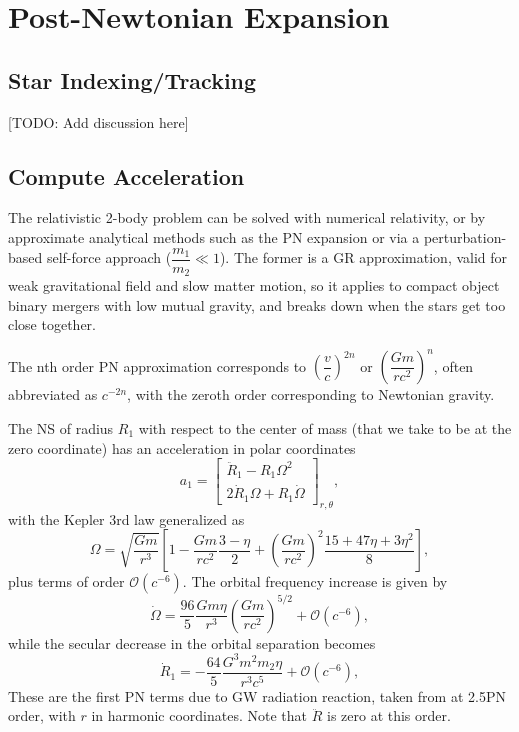 \documentclass{article}
\newcommand{\TODO}[1]{{\color{red}[}{\color{red}TODO:} {\color{blue}#1}{\color{red}]}}
\newcommand{\paren}[1]{\left(#1\right)}
\newcommand{\Ord}[1]{\mathcal{O}\paren{#1}}
\begin{document}
\section{Post-Newtonian Expansion}

\subsection{Star Indexing/Tracking}
\TODO{Add discussion here}

\subsection{Compute Acceleration}

The relativistic 2-body problem can be solved with numerical relativity, or by approximate analytical methods such as the PN expansion or via a perturbation-based self-force approach ($\dfrac{m_1}{m_2}\ll1$).
The former is a GR approximation, valid for weak gravitational field and slow matter motion, so it applies to compact object binary mergers with low mutual gravity, and breaks down when the stars get too close together.

The nth order PN approximation corresponds to $\left(\dfrac{v}{c}\right)^{2n}$ or $\left(\dfrac{G m}{r c^2}\right)^n$, often abbreviated as $c^{-2n}$, with the zeroth order corresponding to Newtonian gravity.

The NS of radius $R_1$ with respect to the center of mass (that we take to be at the zero coordinate) has an acceleration in polar coordinates
$$a_1=\begin{bmatrix}\ddot R_1-R_1\Omega^2\\2\dot R_1\Omega+R_1\dot\Omega\end{bmatrix}_{r,\theta} , $$ 
with the Kepler 3rd law generalized as
$$\Omega=\sqrt{\dfrac{Gm}{r^3}}\left[1-\dfrac{Gm}{rc^2}\dfrac{3-\eta}{2}+\left(\dfrac{Gm}{rc^2}\right)^2\dfrac{15+47\eta+3\eta^2}{8}\right],$$
plus terms of order $\Ord{c^{-6}}$. The orbital frequency increase is given 
by 
\begin{equation}
  \label{eq:pn:omegadot}
  \dot\Omega=\dfrac{96}{5}\dfrac{Gm\eta}{r^3}\left(\dfrac{Gm}{rc^2}\right)^{5/2}+\mathcal O(c^{-6}),
\end{equation}
while the secular decrease in the orbital separation becomes  
\begin{equation}
  \label{eq:pn:rdot}
  \dot R_1=-\dfrac{64}{5}\dfrac{G^3m^2m_2\eta}{r^3c^5}+\mathcal O(c^{-6}),
\end{equation}
These are the first PN terms due to GW radiation reaction, taken from \cite{Blanchet2014} at 2.5PN order, with $r$ in harmonic coordinates. Note that $\ddot R$ is zero at this order.
\end{document}
